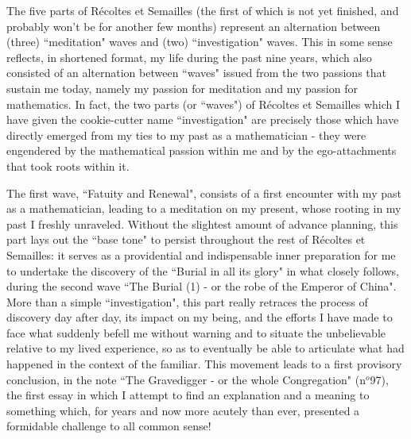 The five parts of R\'ecoltes et Semailles (the first of which is not yet finished, and probably won't be for another few months) represent an alternation between (three) ``meditation" waves and (two) ``investigation" waves. This in some sense reflects, in shortened format, my life during the past nine years, which also consisted of an alternation between ``waves" issued from the two passions that sustain me today, namely my passion for meditation and my passion for mathematics. In fact, the two parts (or ``waves") of R\'ecoltes et Semailles which I have given the cookie-cutter name ``investigation" are precisely those which have directly emerged from my ties to my past as a mathematician - they were engendered by the mathematical passion within me and by the ego-attachments that took roots within it.

The first wave, ``Fatuity and Renewal", consists of a first encounter with my past as a mathematician, leading to a meditation on my present, whose rooting in my past I freshly unraveled. Without the slightest amount of advance planning, this part lays out the ``base tone" to persist throughout the rest of R\'ecoltes et Semailles: it serves as a providential and indispensable inner preparation for me to undertake the discovery of the ``Burial in all its glory" in what closely follows, during the second wave ``The Burial (1) - or the robe of the Emperor of China". More than a simple ``investigation", this part really retraces the process of discovery day after day, its impact on my being, and the efforts I have made to face what suddenly befell me without warning and to situate the unbelievable relative to my lived experience, so as to eventually be able to articulate what had happened in the context of the familiar. This movement leads to a first provisory conclusion, in the note ``The Gravedigger - or the whole Congregation" (n$^o$97), the first essay in which I attempt to find an explanation and a meaning to something which, for years and now more acutely than ever, presented a formidable challenge to all common sense! 

